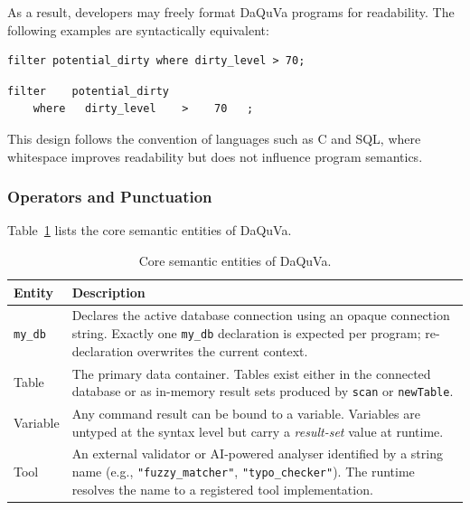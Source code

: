 \begin{itemize}[label=-, noitemsep]
As a result, developers may freely format DaQuVa programs for readability.
The following examples are syntactically equivalent:

\begin{lstlisting}[style=dsl]
filter potential_dirty where dirty_level > 70;
\end{lstlisting}

\begin{lstlisting}[style=dsl]
filter    potential_dirty
    where   dirty_level    >    70   ;
\end{lstlisting}

This design follows the convention of languages such as C and SQL, where
whitespace improves readability but does not influence program semantics.

\subsubsection{Operators and Punctuation}

Table~\ref{tab:entities} lists the core semantic entities of DaQuVa.

\begin{table}[H]
\centering
\caption{Core semantic entities of DaQuVa.}
\label{tab:entities}
\renewcommand{\arraystretch}{1.35}
\begin{tabular}{|p{4cm}|p{9cm}|}
\hline
\textbf{Entity} & \textbf{Description} \\
\hline

\texttt{my\_db} &
Declares the active database connection using an opaque connection string. Exactly one \texttt{my\_db} declaration is expected per program; re-declaration overwrites the current context. \\
\hline

Table &
The primary data container. Tables exist either in the connected database or as in-memory result sets produced by \texttt{scan} or \texttt{newTable}. \\
\hline

Variable &
Any command result can be bound to a variable. Variables are untyped at the syntax level but carry a \emph{result-set} value at runtime. \\
\hline

Tool &
An external validator or AI-powered analyser identified by a string name (e.g., \texttt{"fuzzy\_matcher"}, \texttt{"typo\_checker"}). The runtime resolves the name to a registered tool implementation. \\
\hline


\end{tabular}
\end{table}
\end{itemize}
